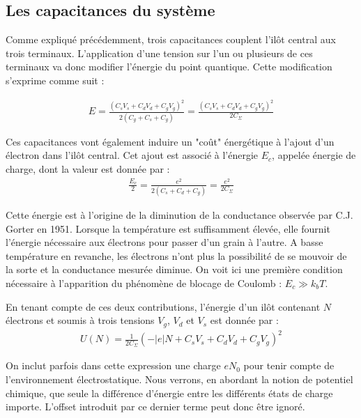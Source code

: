 \subsection{Les capacitances du système}
Comme expliqué précédemment, trois capacitances couplent l'il\^ot central aux trois terminaux. L'application d'une tension sur l'un ou plusieurs de ces terminaux va donc modifier l'énergie du point quantique. Cette modification s'exprime comme suit :

\begin{eqnarray}
E = \frac{(C_sV_s + C_dV_d + C_gV_g)^2}{2(C_g + C_s + C_g)}=\frac{(C_sV_s + C_dV_d + C_gV_g)^2}{2C_{\Sigma}} \nonumber
\end{eqnarray}




Ces capacitances vont également induire un "co\^ut" énergétique à l'ajout d'un électron dans l'il\^ot central. Cet ajout est associé à l'énergie $E_c$, appelée énergie de charge, dont la valeur est donnée par :
\begin{eqnarray}
\frac{E_c}{2} = \frac{e^2}{2(C_s+C_d+C_g)}=\frac{e^2}{2C_{\Sigma}} \nonumber
\end{eqnarray}


Cette énergie est à l'origine de la diminution de la conductance observée par C.J. Gorter en 1951. Lorsque la température est suffisamment élevée, elle fournit l'énergie nécessaire aux électrons pour passer d'un grain à l'autre. A basse température en revanche, les électrons n'ont plus la possibilité de se mouvoir de la sorte et la conductance mesurée diminue. On voit ici une première condition nécessaire à l'apparition du phénomène de blocage de Coulomb : $E_c \gg k_bT$.

En tenant compte de ces deux contributions, l'énergie d'un il\^ot contenant $N$ électrons et soumis à trois tensions $V_g$, $V_d$ et $V_s$ est donnée par :
\begin{eqnarray}
U(N) = \frac{1}{2C_{\Sigma}} (-|e|N + C_sV_s + C_dV_d + C_gV_g)^2
\end{eqnarray}

On inclut parfois dans cette expression une charge $eN_0$ pour tenir compte de l'environnement électrostatique. Nous verrons, en abordant la notion de potentiel chimique, que seule la différence d'énergie entre les différents états de charge importe. L'offset introduit par ce dernier terme peut donc \^etre ignoré. \newline


